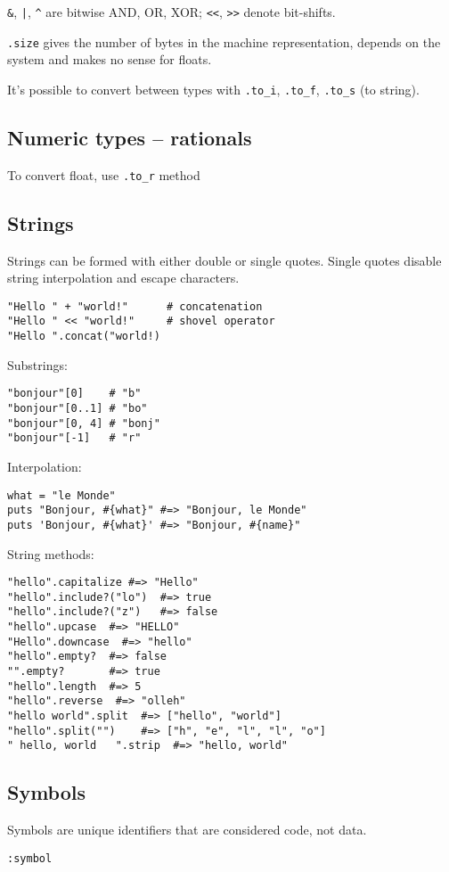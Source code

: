 \documentclass{a5charun}
\begin{document}
\texttt{&}, \texttt{|}, \texttt{^} are bitwise AND, OR, XOR;
\texttt{<<}, \texttt{>>} denote bit-shifts.

\texttt{.size} gives the number of bytes in the machine representation, depends on the system and makes no sense for floats.

It's possible to convert between types with \texttt{.to_i}, \texttt{.to_f}, \texttt{.to_s} (to string).

\subsection{Numeric types -- rationals}
To convert float, use \texttt{.to_r} method

\subsection{Strings}
Strings can be formed with either double or single quotes.
Single quotes disable string interpolation and escape characters.
\begin{verbatim}
"Hello " + "world!"      # concatenation
"Hello " << "world!"     # shovel operator
"Hello ".concat("world!)
\end{verbatim}

Substrings:
\begin{verbatim}
"bonjour"[0]    # "b"
"bonjour"[0..1] # "bo"
"bonjour"[0, 4] # "bonj"
"bonjour"[-1]   # "r"
\end{verbatim}

Interpolation:
\begin{verbatim}
what = "le Monde"
puts "Bonjour, #{what}" #=> "Bonjour, le Monde"
puts 'Bonjour, #{what}' #=> "Bonjour, #{name}"
\end{verbatim}

String methods:
\begin{verbatim}
"hello".capitalize #=> "Hello"
"hello".include?("lo")  #=> true
"hello".include?("z")   #=> false
"hello".upcase  #=> "HELLO"
"Hello".downcase  #=> "hello"
"hello".empty?  #=> false
"".empty?       #=> true
"hello".length  #=> 5
"hello".reverse  #=> "olleh"
"hello world".split  #=> ["hello", "world"]
"hello".split("")    #=> ["h", "e", "l", "l", "o"]
" hello, world   ".strip  #=> "hello, world"
\end{verbatim}

\subsection{Symbols}
Symbols are unique identifiers that are considered code, not data. 
\begin{verbatim}
:symbol
\end{verbatim}
\end{document}
